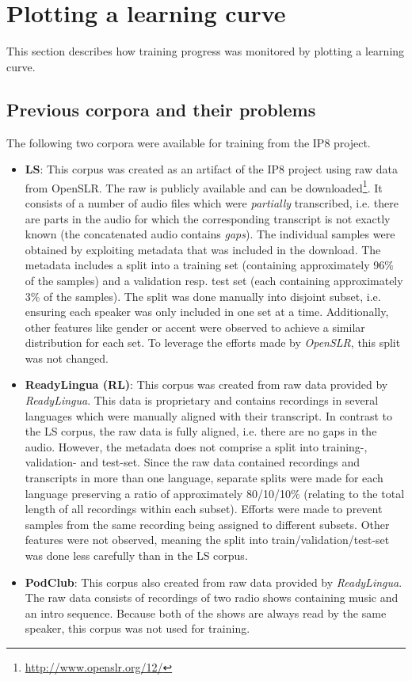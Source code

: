 \section{Plotting a learning curve}

This section describes how training progress was monitored by plotting a learning curve.

\subsection{Previous corpora and their problems}

The following two corpora were available for training from the IP8 project.

\begin{itemize}
	\item \textbf{\ac{LS}}: This corpus was created as an artifact of the IP8 project using raw data from OpenSLR. The raw is publicly available and can be downloaded\footnote{\url{http://www.openslr.org/12/}}. It consists of a number of audio files which were \textit{partially} transcribed, i.e. there are parts in the audio for which the corresponding transcript is not exactly known (the concatenated audio contains \textit{gaps}). The individual samples were obtained by exploiting metadata that was included in the download. The metadata includes a split into a training set (containing approximately 96\% of the samples) and a validation resp. test set (each containing approximately 3\% of the samples). The split was done manually into disjoint subset, i.e. ensuring each speaker was only included in one set at a time. Additionally, other features like gender or accent were observed to achieve a similar distribution for each set. To leverage the efforts made by \textit{OpenSLR}, this split was not changed.
	\item \textbf{ReadyLingua (RL)}: This corpus was created from raw data provided by \textit{ReadyLingua}. This data is proprietary and contains recordings in several languages which were manually aligned with their transcript. In contrast to the \ac{LS} corpus, the raw data is fully aligned, i.e. there are no gaps in the audio. However, the metadata does not comprise a split into training-, validation- and test-set. Since the raw data contained recordings and transcripts in more than one language, separate splits were made for each language preserving a ratio of approximately 80/10/10\% (relating to the total length of all recordings within each subset). Efforts were made to prevent samples from the same recording being assigned to different subsets. Other features were not observed, meaning the split into train/validation/test-set was done less carefully than in the \ac{LS} corpus.
	\item \textbf{PodClub}: This corpus also created from raw data provided by \textit{ReadyLingua}. The raw data consists of recordings of two radio shows containing music and an intro sequence. Because both of the shows are always read by the same speaker, this corpus was not used for training.
\end{itemize}


